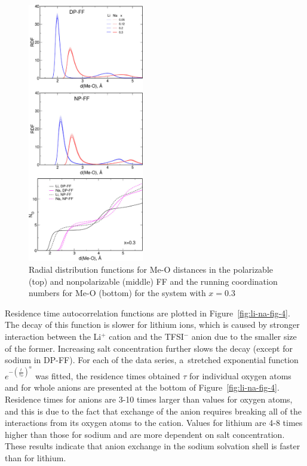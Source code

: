 \begin{figure}[H]
    \centering
    \includegraphics[width=0.45\textwidth]{img/3-structural-data-from-md-simulations/2-li-na/fig1.png}
    \caption{Radial distribution functions for Me-O distances in the polarizable (top) and nonpolarizable (middle) FF and the running coordination numbers for Me-O (bottom) for the system with $x = 0.3$}
    \label{fig:li-na-fig-1}
\end{figure}

Residence time autocorrelation functions are plotted in Figure~\ref{fig:li-na-fig-4}. The decay of this function is slower for lithium ions, which is caused by stronger interaction between the Li$^{+}$ cation and the TFSI$^{-}$ anion due to the smaller size of the former. Increasing salt concentration further slows the decay (except for sodium in DP-FF). For each of the data series, a~stretched exponential function $e^{-\left(\frac{t}{\tau_O}\right)^{\alpha}}$ was fitted, the residence times obtained $\tau$ for individual oxygen atoms and for whole anions are presented at the bottom of Figure~\ref{fig:li-na-fig-4}. Residence times for anions are 3-10 times larger than values for oxygen atoms, and this is due to the fact that exchange of the anion requires breaking all of the interactions from its oxygen atoms to the cation. Values for lithium are 4-8 times higher than those for sodium and are more dependent on salt concentration. These results indicate that anion exchange in the sodium solvation shell is faster than for lithium.

